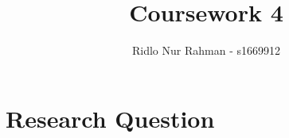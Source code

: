 \documentclass[a4paper]{article}
\title{Coursework 4}
\author{Ridlo Nur Rahman - s1669912}
\affil{Machine Learning Practical}
\date{}
\begin{document}
	\maketitle
	
	\tableofcontents
	
	\section{Research Question}
	\label{sec:question}
	
\end{document}
